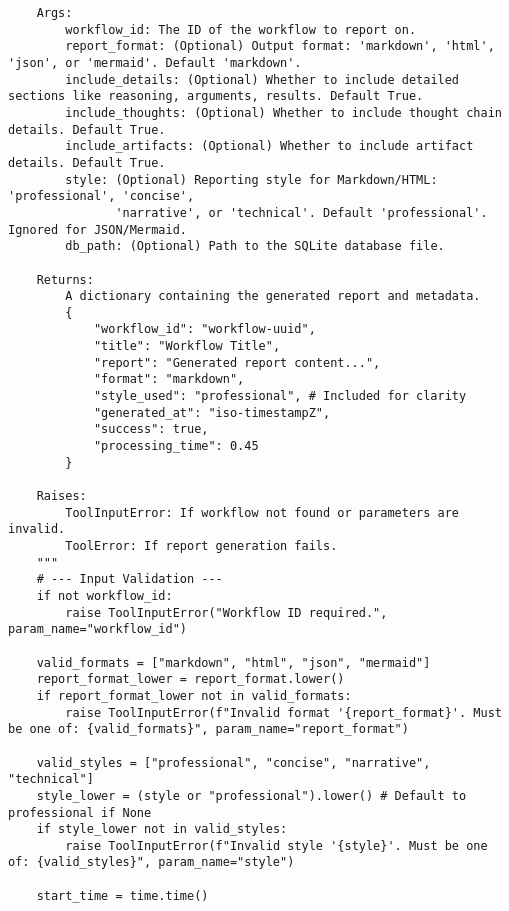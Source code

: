 \documentclass[12pt,a4paper]{article}
\begin{document}
\begin{pageablecode}
\begin{verbatim}
    Args:
        workflow_id: The ID of the workflow to report on.
        report_format: (Optional) Output format: 'markdown', 'html', 'json', or 'mermaid'. Default 'markdown'.
        include_details: (Optional) Whether to include detailed sections like reasoning, arguments, results. Default True.
        include_thoughts: (Optional) Whether to include thought chain details. Default True.
        include_artifacts: (Optional) Whether to include artifact details. Default True.
        style: (Optional) Reporting style for Markdown/HTML: 'professional', 'concise',
               'narrative', or 'technical'. Default 'professional'. Ignored for JSON/Mermaid.
        db_path: (Optional) Path to the SQLite database file.

    Returns:
        A dictionary containing the generated report and metadata.
        {
            "workflow_id": "workflow-uuid",
            "title": "Workflow Title",
            "report": "Generated report content...",
            "format": "markdown",
            "style_used": "professional", # Included for clarity
            "generated_at": "iso-timestampZ",
            "success": true,
            "processing_time": 0.45
        }

    Raises:
        ToolInputError: If workflow not found or parameters are invalid.
        ToolError: If report generation fails.
    """
    # --- Input Validation ---
    if not workflow_id:
        raise ToolInputError("Workflow ID required.", param_name="workflow_id")

    valid_formats = ["markdown", "html", "json", "mermaid"]
    report_format_lower = report_format.lower()
    if report_format_lower not in valid_formats:
        raise ToolInputError(f"Invalid format '{report_format}'. Must be one of: {valid_formats}", param_name="report_format")

    valid_styles = ["professional", "concise", "narrative", "technical"]
    style_lower = (style or "professional").lower() # Default to professional if None
    if style_lower not in valid_styles:
        raise ToolInputError(f"Invalid style '{style}'. Must be one of: {valid_styles}", param_name="style")

    start_time = time.time()


\end{verbatim}
\end{pageablecode}
\end{document}
